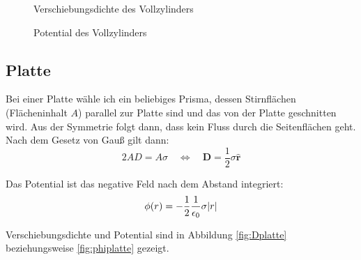 \documentclass[11pt, ngerman, fleqn]{article}
\newcommand{\half}{\frac 12}
\renewcommand{\vec}[1]{\boldsymbol{#1}}
\begin{document}
\begin{figure}[h]
	\centering
	\begin{minipage}[b]{0.45\textwidth}
		\centering
		\caption{Verschiebungsdichte des Vollzylinders}
		\label{fig:Dvoll}
	\end{minipage}
	\begin{minipage}[b]{0.45\textwidth}
		\centering
		\caption{Potential des Vollzylinders}
		\label{fig:phivoll}
	\end{minipage}
\end{figure}

\subsection{Platte}

Bei einer Platte wähle ich ein beliebiges Prisma, dessen Stirnflächen (Flächeninhalt $A$) parallel zur Platte sind und das von der Platte geschnitten wird. Aus der Symmetrie folgt dann, dass kein Fluss durch die Seitenflächen geht. Nach dem Gesetz von Gauß gilt dann:
\[
	2 A D = A \sigma
	\quad \Leftrightarrow \quad
	\vec D = \half \sigma \hat{\vec r}
\]

Das Potential ist das negative Feld nach dem Abstand integriert:
\[
	\phi(r) = - \half \frac{1}{\epsilon_0} \sigma \abs r
\]

Verschiebungsdichte und Potential sind in Abbildung \ref{fig:Dplatte} beziehungsweise \ref{fig:phiplatte} gezeigt.
\end{document}
